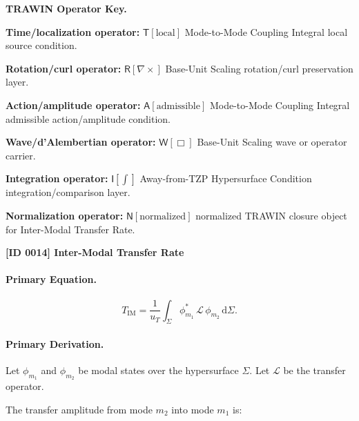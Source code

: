 \par\vspace{0.45\baselineskip}
\noindent\begin{minipage}[t]{\linewidth}
\begingroup
\small
\raggedright
\textbf{TRAWIN Operator Key.}\par
\noindent\textbf{Time/localization operator:} $\mathsf{T}\!\left[\mathrm{local}\right]$ Mode-to-Mode Coupling Integral local source condition.\par
\noindent\textbf{Rotation/curl operator:} $\mathsf{R}\!\left[\nabla\times\right]$ Base-Unit Scaling rotation/curl preservation layer.\par
\noindent\textbf{Action/amplitude operator:} $\mathsf{A}\!\left[\mathrm{admissible}\right]$ Mode-to-Mode Coupling Integral admissible action/amplitude condition.\par
\noindent\textbf{Wave/d'Alembertian operator:} $\mathsf{W}\!\left[\Box\right]$ Base-Unit Scaling wave or operator carrier.\par
\noindent\textbf{Integration operator:} $\mathsf{I}\!\left[\int\right]$ Away-from-TZP Hypersurface Condition integration/comparison layer.\par
\noindent\textbf{Normalization operator:} $\mathsf{N}\!\left[\mathrm{normalized}\right]$ normalized TRAWIN closure object for Inter-Modal Transfer Rate.\par
\endgroup
\end{minipage}

\clearpage
\noindent\textbf{[ID 0014] Inter-Modal Transfer Rate}\par
\vspace{0.35em}
\paragraph{Primary Equation.}
\begin{equation}
T_{\mathrm{IM}}
=
\frac{1}{u_T}
\int_{\Sigma}
\phi_{m_1}^{*}
\,\mathcal{L}\,
\phi_{m_2}
\,\mathrm{d}\Sigma .
\end{equation}

\paragraph{Primary Derivation.}
Let $\phi_{m_1}$ and $\phi_{m_2}$ be modal states over the hypersurface $\Sigma$.  
Let $\mathcal{L}$ be the transfer operator.

The transfer amplitude from mode $m_2$ into mode $m_1$ is:

